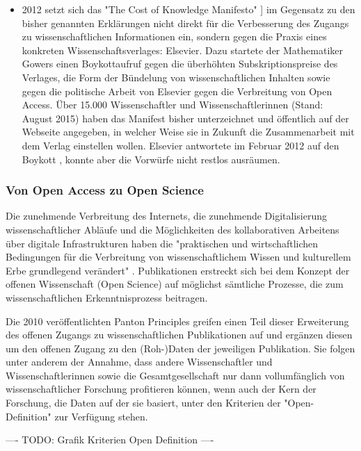 \begin{itemize}
\item 2012 setzt sich das "The Cost of Knowledge Manifesto" \cite{Gowers_2012} ] im Gegensatz zu den bisher genannten Erklärungen nicht direkt für die Verbesserung des Zugangs zu wissenschaftlichen Informationen ein, sondern gegen die Praxis eines konkreten Wissenschaftsverlages: Elsevier. Dazu startete der Mathematiker Gowers einen Boykottaufruf gegen die überhöhten Subskriptionspreise des Verlages, die Form der Bündelung von wissenschaftlichen Inhalten sowie gegen die politische Arbeit von Elsevier gegen die Verbreitung von Open Access. Über 15.000 Wissenschaftler und Wissenschaftlerinnen (Stand: August 2015) haben das Manifest bisher unterzeichnet und öffentlich auf der Webseite angegeben, in welcher Weise sie in Zukunft die Zusammenarbeit mit dem Verlag einstellen wollen. Elsevier antwortete im Februar 2012 auf den Boykott \cite{Elsevier_2012}, konnte aber die Vorwürfe nicht restlos ausräumen.
\end{itemize}

\subsubsection{Von Open Access zu Open Science}

Die zunehmende Verbreitung des Internets, die zunehmende Digitalisierung wissenschaftlicher Abläufe und die Möglichkeiten des kollaborativen Arbeitens über digitale Infrastrukturen haben die "praktischen und wirtschaftlichen Bedingungen für die Verbreitung von wissenschaftlichem Wissen und kulturellem Erbe grundlegend verändert" \cite{Berliner_Erklaerung_2003}. Publikationen erstreckt sich bei dem Konzept der offenen Wissenschaft (Open Science) auf möglichst sämtliche Prozesse, die zum wissenschaftlichen Erkenntnisprozess beitragen.

Die 2010 veröffentlichten Panton Principles \cite{Murray-Rust_2015} greifen einen Teil dieser Erweiterung des offenen Zugangs zu wissenschaftlichen Publikationen auf und ergänzen diesen um den offenen Zugang zu den (Roh-)Daten der jeweiligen Publikation. Sie folgen unter anderem der Annahme, dass andere Wissenschaftler und Wissenschaftlerinnen sowie die Gesamtgesellschaft nur dann vollumfänglich von wissenschaftlicher Forschung profitieren können, wenn auch der Kern der Forschung, die Daten auf der sie basiert, unter den Kriterien der "Open-Definition" \cite{Open_Definition_2014} zur Verfügung stehen.

---- TODO: Grafik Kriterien Open Definition ----


